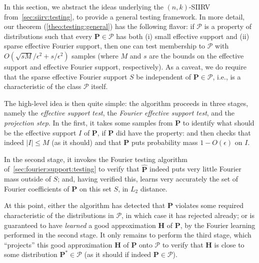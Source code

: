 \documentclass[11pt]{article}
\makeatletter
\renewcommand{\section}{\@startsection{section}{1}{0pt}{-12pt}{5pt}{\large\bf}}
\theoremstyle{definition}
\newcommand{\p}{\mathbf{P}}
\newcommand{\h}{\mathbf{H}}
\newcommand{\eps}{\epsilon}
\newcommand{\abs}[1]{\lvert#1\rvert}
\renewcommand{\abs}[1]{\left\lvert #1 \right\rvert}
\newcommand{\fourier}[1]{\widehat{#1}}
\makeatother
\begin{document}
 
\section{The General Tester}\label{sec:general:testing}
In this section, we abstract the ideas underlying the $(n,k)$-SIIRV from~\cref{sec:siirv:testing}, to provide a general testing framework. In more detail, our theorem (\cref{theo:testing:general}) has the following flavor: if $\mathcal{P}$ is a property of distributions such that every $\p\in\mathcal{P}$ has both (i) small effective support and (ii) sparse effective Fourier support, then one can test membership to $\mathcal{P}$ with $O(\sqrt{sM}/\eps^2+s/\eps^2)$ samples (where $M$ and $s$ are the bounds on the effective support and effective Fourier support, respectively). As a caveat, we do require that the sparse effective Fourier support $S$ be independent of $\p\in\mathcal{P}$, i.e., is a characteristic of the class $\mathcal{P}$ itself.

The high-level idea is then quite simple: the algorithm proceeds in three stages, namely the \emph{effective support test}, the \emph{Fourier effective support test}, and the \emph{projection step}. In the first, it takes some samples from $\p$ to identify what should be the effective support $I$ of $\p$, if $\p$ did have the property: and then checks that indeed $\abs{I}\leq M$ (as it should) and that $\p$ puts probability mass $1-O(\eps)$ on $I$.

In the second stage, it invokes the Fourier testing algorithm of~\cref{sec:fourier:support:testing} to verify that $\fourier{\p}$ indeed puts very little Fourier mass outside of $S$; and, having verified this, learns very accurately the set of Fourier coefficients of $\p$ on this set $S$, in $L_2$ distance.

At this point, either the algorithm has detected that $\p$ violates some required characteristic of the distributions in $\mathcal{P}$, in which case it has rejected already; or is guaranteed to have \emph{learned} a good approximation $\h$ of $\p$, by the Fourier learning performed in the second stage. It only remains to perform the third stage, which ``projects'' this good approximation $\h$ of $\p$ onto $\mathcal{P}$ to verify that $\h$ is close to some distribution $\p^\ast\in\mathcal{P}$ (as it should if indeed $\p\in\mathcal{P}$).
\end{document}
